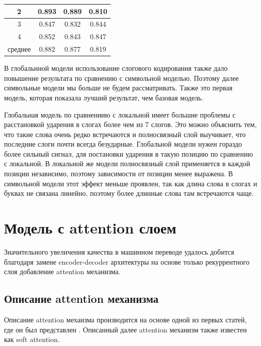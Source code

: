 \documentclass[14pt, a4paper, russian]{report}
\begin{document}
\begin{normalsize}
\begin{table}[H]
\begin{small}
\begin{center}
\begin{tabular}{|c | c | c|c|}
				2       & 0.893&      0.889      & 0.810             \\ \hline
				3       & 0.847&      0.832      & 0.844             \\ \hline
				4       & 0.852&      0.843      & 0.847             \\ \hline
				среднее    & 0.882 &      0.877      & 0.819             \\ \hline
			\end{tabular}
		\end{center}
	\end{small}
	\label{table:global_syl}
\end{table}
В глобальнной модели использование слогового кодирования также дало повышение результата по сравнению с символьной моделью. Поэтому далее символьные модели мы больше не будем рассматривать.  Также это первая модель, которая показала лучший результат, чем базовая модель. 

Глобальная модель  по сравнениию с локальной имеет большие проблемы с расстановкой ударения в слогах более чем из 7 слогов. Это можно объяснить тем, что такие слова очень редко встречаются и полносвязный слой выучивает, что последние слоги почти всегда безударные. Глобальной модели нужен гораздо более сильный сигнал, для постановки ударения в такую позицию по сравнению с локальной. В локальной же модели полносвязный слой применяется в каждой позиции независимо, поэтому зависимости от позиции менее выражена. В символьной модели этот эффект меньше проявлен, так как длина слова в слогах и буквах не связана линейно, поэтому более длинные слова там встречаются чаще. 

\section{Модель с attention слоем}
Значительного увеличения качества в машинном переводе удалось добится благодаря замене encoder-decoder архитектуры на основе только рекуррентного слоя добавление attention механизма. 
\subsection{Описание attention механизма}
Описание attention мехаизма производится на основе одной из первых статей, где он был представлен \cite{bahdanau}. Описанный далее attention механизм также известен как soft attention.


\end{normalsize}
\end{document}
